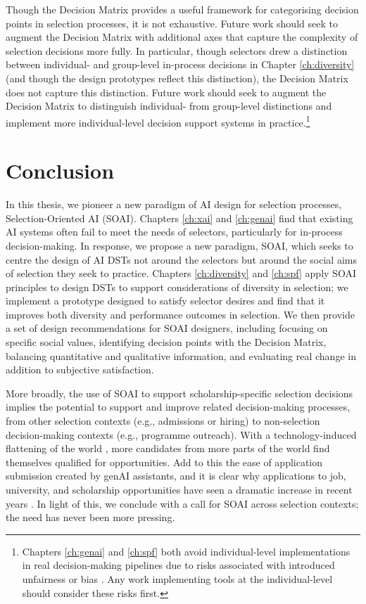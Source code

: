 Though the Decision Matrix provides a useful framework for categorising decision points in selection processes, it is not exhaustive. Future work should seek to augment the Decision Matrix with additional axes that capture the complexity of selection decisions more fully. In particular, though selectors drew a distinction between individual- and group-level in-process decisions in Chapter \ref{ch:diversity} (and though the design prototypes reflect this distinction), the Decision Matrix does not capture this distinction. Future work should seek to augment the Decision Matrix to distinguish individual- from group-level distinctions and implement more individual-level decision support systems in practice.\footnote{Chapters \ref{ch:genai} and \ref{ch:spf} both avoid individual-level implementations in real decision-making pipelines due to risks associated with introduced unfairness or bias \cite{hartigan_fairness_1989,barocas2023fairness,pmlr-v80-kearns18a,Bastounis_Campodonico_vanderSchaar_Adcock_Hansen_2024,liang_gpt_2023}. Any work implementing tools at the individual-level should consider these risks first.}

\section{Conclusion}
In this thesis, we pioneer a new paradigm of AI design for selection processes, Selection-Oriented AI (SOAI). Chapters \ref{ch:xai} and \ref{ch:genai} find that existing AI systems often fail to meet the needs of selectors, particularly for in-process decision-making. In response, we propose a new paradigm, SOAI, which seeks to centre the design of AI DSTs not around the selectors but around the social aims of selection they seek to practice. Chapters \ref{ch:diversity} and \ref{ch:spf} apply SOAI principles to design DSTs to support considerations of diversity in selection; we implement a prototype designed to satisfy selector desires and find that it improves both diversity and performance outcomes in selection. We then provide a set of design recommendations for SOAI designers, including focusing on specific social values, identifying decision points with the Decision Matrix, balancing quantitative and qualitative information, and evaluating real change in addition to subjective satisfaction.

More broadly, the use of SOAI to support scholarship-specific selection decisions implies the potential to support and improve related decision-making processes, from other selection contexts (e.g., admissions or hiring) to non-selection decision-making contexts (e.g., programme outreach). With a technology-induced flattening of the world \cite{Friedman_2005}, more candidates from more parts of the world find themselves qualified for opportunities. Add to this the ease of application submission created by genAI assistants, and it is clear why applications to job, university, and scholarship opportunities have seen a dramatic increase in recent years \cite{Kaashoek2024Impact}. In light of this, we conclude with a call for SOAI across selection contexts; the need has never been more pressing.